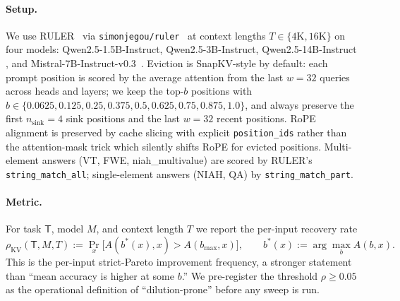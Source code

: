 \documentclass{article}
\begin{document}
\paragraph{Setup.} We use RULER~\citep{arxiv240406654} via
\texttt{simonjegou/ruler}~\citep{ruler-hf} at context lengths
$T \in \{4\mathrm{K}, 16\mathrm{K}\}$
on four models: Qwen2.5-1.5B-Instruct, Qwen2.5-3B-Instruct, Qwen2.5-14B-Instruct
\citep{arxiv241215115}, and Mistral-7B-Instruct-v0.3~\citep{arxiv231006825}. Eviction is SnapKV-style by default: each prompt
position is scored by the average attention from the last $w = 32$ queries across
heads and layers; we keep the top-$b$ positions with $b \in
\{0.0625, 0.125, 0.25, 0.375, 0.5, 0.625, 0.75, 0.875, 1.0\}$, and always
preserve the first $n_{\text{sink}} = 4$ sink positions and the last $w = 32$
recent positions. RoPE alignment is preserved by cache slicing with explicit
\texttt{position\_ids} rather than the attention-mask trick which silently shifts
RoPE for evicted positions. Multi-element answers (VT, FWE, niah\_multivalue)
are scored by RULER's \texttt{string\_match\_all}; single-element answers
(NIAH, QA) by \texttt{string\_match\_part}.

\paragraph{Metric.} For task $\mathsf{T}$, model $M$, and context length
$T$ we report the per-input recovery rate
\begin{equation}
\rho_{\mathrm{KV}}(\mathsf{T}, M, T) := \Pr_{x}\bigl[A(b^{\ast}(x), x) > A(b_{\max}, x)\bigr],
\qquad b^{\ast}(x) := \arg\max_{b} A(b, x).
\label{eq:rho}
\end{equation}
This is the per-input strict-Pareto improvement frequency, a stronger statement
than ``mean accuracy is higher at some $b$.'' We pre-register the threshold
$\rho \ge 0.05$ as the operational definition of ``dilution-prone'' before any
sweep is run.
\end{document}
